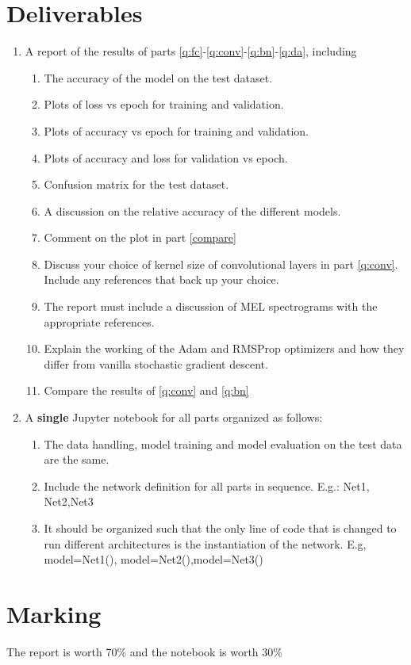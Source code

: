 \documentclass{article}
\begin{document}
\section{Deliverables}
\begin{enumerate}
    \item\label{q:report} A report of the results of parts \ref{q:fc}-\ref{q:conv}-\ref{q:bn}-\ref{q:da}, including 
    \begin{enumerate}
        \item The accuracy of the model on the test dataset.
        \item Plots of loss vs epoch for training and validation.
        \item Plots of accuracy vs epoch for training and validation.
        \item Plots of accuracy and loss for validation vs epoch.\label{compare}
        \item Confusion matrix for the test dataset.
        \item A discussion on the relative accuracy of the different models.
        \item Comment on the plot in part \ref{compare} 
   
    \item Discuss your choice of kernel size of convolutional layers in part \ref{q:conv}. Include any references that back up your choice.
    \item The report must include a discussion of MEL spectrograms with the appropriate references.
    \item Explain the working of the Adam and RMSProp optimizers and how they differ from vanilla stochastic gradient descent.
    \item Compare the results of \ref{q:conv} and \ref{q:bn}
    \end{enumerate}
    \item A \textbf{single} Jupyter notebook for all parts organized as follows:
    \begin{enumerate}
        \item The data handling, model training and model evaluation on the test data are the same.
        \item Include the network definition for all parts in sequence. E.g.: Net1, Net2,Net3
        \item It should be organized such that the only line of code that is changed to run different architectures is the instantiation of the network. E.g, model=Net1(), model=Net2(),model=Net3()
      
    \end{enumerate}
\end{enumerate}
\section{Marking}
The report is worth 70\% and the notebook is worth 30\%
\end{document}
